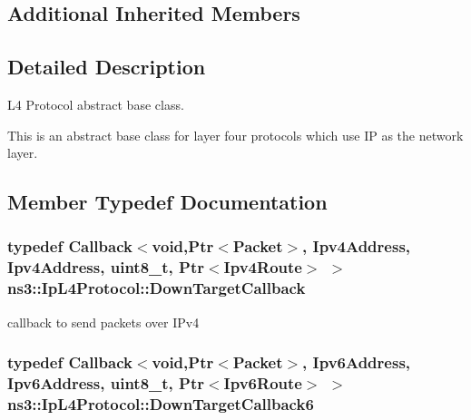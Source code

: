 \subsection*{Additional Inherited Members}


\subsection{Detailed Description}
L4 Protocol abstract base class. 

This is an abstract base class for layer four protocols which use IP as the network layer. 

\subsection{Member Typedef Documentation}
\subsubsection[{\texorpdfstring{Down\+Target\+Callback}{DownTargetCallback}}]{\setlength{\rightskip}{0pt plus 5cm}typedef {\bf Callback}$<$void,{\bf Ptr}$<${\bf Packet}$>$, {\bf Ipv4\+Address}, {\bf Ipv4\+Address}, uint8\+\_\+t, {\bf Ptr}$<${\bf Ipv4\+Route}$>$ $>$ {\bf ns3\+::\+Ip\+L4\+Protocol\+::\+Down\+Target\+Callback}}\hypertarget{classns3_1_1IpL4Protocol_ae3ba76c0a48fbaa90529c528a15f12b6}{}\label{classns3_1_1IpL4Protocol_ae3ba76c0a48fbaa90529c528a15f12b6}


callback to send packets over I\+Pv4 

\subsubsection[{\texorpdfstring{Down\+Target\+Callback6}{DownTargetCallback6}}]{\setlength{\rightskip}{0pt plus 5cm}typedef {\bf Callback}$<$void,{\bf Ptr}$<${\bf Packet}$>$, {\bf Ipv6\+Address}, {\bf Ipv6\+Address}, uint8\+\_\+t, {\bf Ptr}$<${\bf Ipv6\+Route}$>$ $>$ {\bf ns3\+::\+Ip\+L4\+Protocol\+::\+Down\+Target\+Callback6}}\hypertarget{classns3_1_1IpL4Protocol_a039f3d1883632ab922fa958fc9ecd97f}{}\label{classns3_1_1IpL4Protocol_a039f3d1883632ab922fa958fc9ecd97f}


